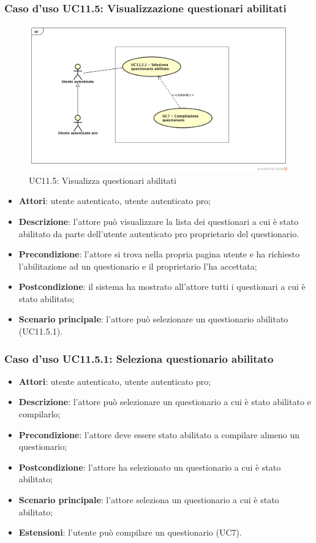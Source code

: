 \subsubsection{Caso d'uso UC11.5: Visualizzazione questionari abilitati}
\label{UC11.5}
\begin{figure}[h]
	\centering
	\includegraphics[scale=0.5]{UML/UC11_5.png}
	\caption{UC11.5: Visualizza questionari abilitati}
\end{figure}
\begin{itemize}
\item\textbf{Attori}: utente autenticato, utente autenticato pro;
\item\textbf{Descrizione}: l'attore può visualizzare la lista dei questionari a cui è stato abilitato da parte dell'utente autenticato pro proprietario del questionario.
\item\textbf{Precondizione}: l'attore si trova nella propria pagina utente e ha richiesto l'abilitazione ad un questionario e il proprietario l'ha accettata;
\item\textbf{Postcondizione}: il sistema ha mostrato all'attore tutti i questionari a cui è stato abilitato;
\item\textbf{Scenario principale}: l'attore può selezionare un questionario abilitato (UC11.5.1).
\end{itemize}

\subsubsection{Caso d'uso UC11.5.1: Seleziona questionario abilitato}
\begin{itemize}
\item\textbf{Attori}: utente autenticato, utente autenticato pro;
\item\textbf{Descrizione}: l'attore può selezionare un questionario a cui è stato abilitato e compilarlo;
\item\textbf{Precondizione}: l'attore deve essere stato abilitato a compilare almeno un questionario;
\item\textbf{Postcondizione}: l'attore ha selezionato un questionario a cui è stato abilitato;
\item\textbf{Scenario principale}: l'attore seleziona un questionario a cui è stato abilitato;
\item \textbf{Estensioni}: l'utente può compilare un questionario (UC7).
\end{itemize}


